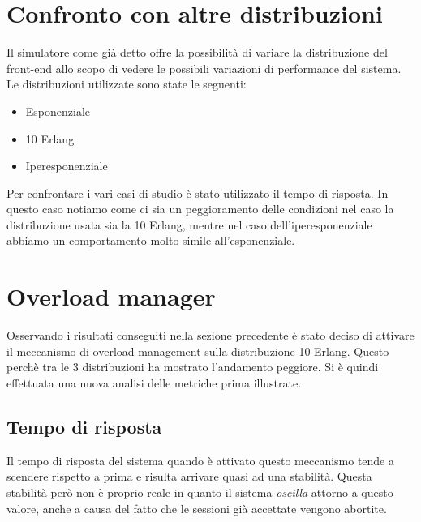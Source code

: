  \section{Confronto con altre distribuzioni}
 Il simulatore come già detto offre la possibilità di variare la distribuzione del front-end allo scopo di vedere le possibili variazioni di performance del sistema.
 Le distribuzioni utilizzate sono state le seguenti:
 \begin{itemize}
  \item Esponenziale
  \item 10 Erlang
  \item Iperesponenziale
 \end{itemize}
Per confrontare i vari casi di studio è stato utilizzato il tempo di risposta. In questo caso notiamo come ci sia un peggioramento delle condizioni nel caso la distribuzione usata sia la 10 Erlang, mentre nel caso dell'iperesponenziale abbiamo un comportamento molto simile all'esponenziale.

\section{Overload manager}
Osservando i risultati conseguiti nella sezione precedente è stato deciso di attivare il meccanismo di overload management sulla distribuzione 10 Erlang. Questo perchè tra le 3 distribuzioni ha mostrato l'andamento peggiore. Si è quindi effettuata una nuova analisi delle metriche prima illustrate.

\subsection{Tempo di risposta}
Il tempo di risposta del sistema quando è attivato questo meccanismo tende a scendere rispetto a prima e risulta arrivare quasi ad una stabilità. Questa stabilità però non è proprio reale in quanto il sistema \textit{oscilla} attorno a questo valore, anche a causa del fatto che le sessioni già accettate vengono abortite.

